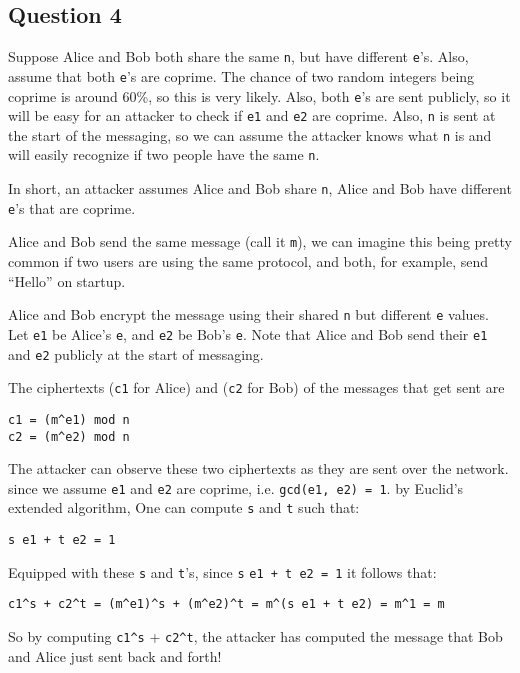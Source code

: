 \documentclass[11pt]{article}
\begin{document}
\subsection*{Question 4}

Suppose Alice and Bob both share the same \verb|n|, but have different \verb|e|’s. Also, assume that both \verb|e|’s are coprime. The chance of two random integers being coprime is around 60\%, so this is very likely. Also, both \verb|e|'s are sent publicly, so it will be easy for an attacker to check if \verb|e1| and \verb|e2| are coprime. Also, \verb|n| is sent at the start of the messaging, so we can assume the attacker knows what \verb|n| is and will easily recognize if two people have the same \verb|n|.

In short, an attacker assumes Alice and Bob share \verb|n|, Alice and Bob have different \verb|e|’s that are coprime.

Alice and Bob send the same message (call it \verb|m|), we can imagine this being pretty common if two users are using the same protocol, and both, for example, send “Hello” on startup.

Alice and Bob encrypt the message using their shared \verb|n| but different \verb|e| values. Let \verb|e1| be Alice’s \verb|e|, and \verb|e2| be Bob’s \verb|e|. Note that Alice and Bob send their \verb|e1| and \verb|e2| publicly at the start of messaging.

The ciphertexts (\verb|c1| for Alice) and (\verb|c2| for Bob) of the messages that get sent are

\begin{verbatim}
c1 = (m^e1) mod n 
c2 = (m^e2) mod n
\end{verbatim}

The attacker can observe these two ciphertexts as they are sent over the network.
since we assume \verb|e1| and \verb|e2| are coprime, i.e. \verb|gcd(e1, e2) = 1|. by Euclid's extended algorithm, 
One can compute \verb|s| and \verb|t| such that:

\begin{verbatim}
s e1 + t e2 = 1
\end{verbatim}

Equipped with these \verb|s| and \verb|t|’s, since \verb|s| \verb|e1 + t e2 = 1| it follows that:
\begin{verbatim}
c1^s + c2^t = (m^e1)^s + (m^e2)^t = m^(s e1 + t e2) = m^1 = m
\end{verbatim}

So by computing \verb|c1^s| + \verb|c2^t|, the attacker has computed the message that Bob and Alice just sent back and forth!
\end{document}
